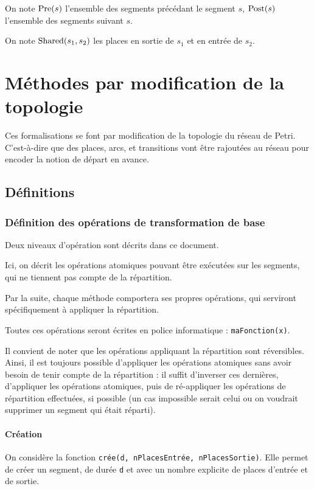 \begin{mynot}
On note $\operatorname{Pre}(s)$ l'ensemble des segments précédant le segment $s$, $\operatorname{Post}(s)$ l'ensemble des segments suivant $s$.
\end{mynot}

\begin{mynot}
On note $\operatorname{Shared}(s_1, s_2)$ les places en sortie de $s_1$ et en entrée de $s_2$.
\end{mynot}

\section{Méthodes par modification de la topologie}
Ces formalisations se font par modification de la topologie du réseau de Petri. C'est-à-dire que des places, arcs, et transitions vont être rajoutées au réseau pour encoder la notion de départ en avance.

\subsection{Définitions}
\subsubsection{Définition des opérations de transformation de base}
Deux niveaux d'opération sont décrits dans ce document.

Ici, on décrit les opérations atomiques pouvant être exécutées sur les segments, qui ne tiennent pas compte de la répartition. 

Par la suite, chaque méthode comportera ses propres opérations, qui serviront spécifiquement à appliquer la répartition. 

Toutes ces opérations seront écrites en police informatique : \texttt{maFonction(x)}.

Il convient de noter que les opérations appliquant la répartition sont réversibles. Ainsi, il est toujours possible d'appliquer les opérations atomiques sans avoir besoin de tenir compte de la répartition : il suffit d'inverser ces dernières, d'appliquer les opérations atomiques, puis de ré-appliquer les opérations de répartition effectuées, si possible (un cas impossible serait celui ou on voudrait supprimer un segment qui était réparti).

\paragraph{Création}
On considère la fonction \texttt{crée(d, nPlacesEntrée, nPlacesSortie)}. Elle permet de créer un segment, de durée \texttt{d} et avec un nombre explicite de places d'entrée et de sortie.

